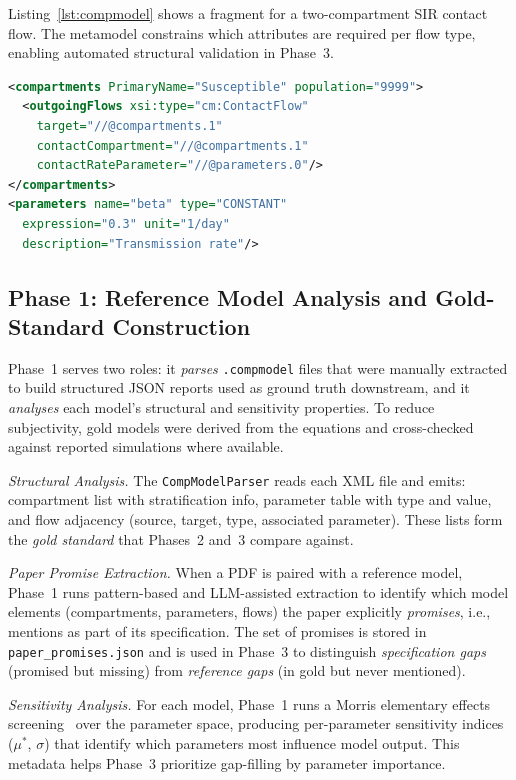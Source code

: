 Listing~\ref{lst:compmodel} shows a fragment for a two-compartment SIR contact flow.
The metamodel constrains which attributes are required per flow type, enabling
automated structural validation in Phase~3.

\begin{lstlisting}[caption={Fragment of a \texttt{.compmodel} file showing a ContactFlow
from Susceptible to Infectious parameterized by transmission rate $\beta$.},
label={lst:compmodel}, language=XML]
<compartments PrimaryName="Susceptible" population="9999">
  <outgoingFlows xsi:type="cm:ContactFlow"
    target="//@compartments.1"
    contactCompartment="//@compartments.1"
    contactRateParameter="//@parameters.0"/>
</compartments>
<parameters name="beta" type="CONSTANT"
  expression="0.3" unit="1/day"
  description="Transmission rate"/>
\end{lstlisting}

\subsection{Phase 1: Reference Model Analysis and Gold-Standard Construction}
\label{sec:phase1}

Phase~1 serves two roles: it \emph{parses} \texttt{.compmodel} files that were manually extracted to build structured JSON reports used as ground truth downstream, and it \emph{analyses} each model's structural and sensitivity properties.
To reduce subjectivity, gold models were derived from the equations and cross-checked
against reported simulations where available.

\textit{Structural Analysis.} The \texttt{CompModelParser} reads each XML file and
emits: compartment list with stratification info, parameter table with type and value,
and flow adjacency (source, target, type, associated parameter). These lists form
the \emph{gold standard} that Phases~2 and~3 compare against.

\textit{Paper Promise Extraction.} When a PDF is paired with a reference model,
Phase~1 runs pattern-based and LLM-assisted extraction to identify which model elements
(compartments, parameters, flows) the paper explicitly \emph{promises}, i.e., mentions
as part of its specification. The set of promises is stored in \texttt{paper\_promises.json}
and is used in Phase~3 to distinguish \emph{specification gaps} (promised but missing)
from \emph{reference gaps} (in gold but never mentioned).

\textit{Sensitivity Analysis.} For each model, Phase~1 runs a Morris elementary
effects screening~\cite{morris1991factorial} over the parameter space, producing per-parameter sensitivity
indices ($\mu^*$, $\sigma$) that identify which parameters most influence model
output. This metadata helps Phase~3 prioritize gap-filling by parameter importance.

